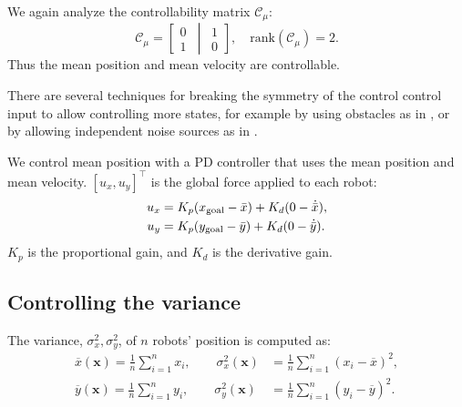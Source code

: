 We again analyze the controllability matrix $\mathcal{C}_{\mu}$:
\begin{equation}
\mathcal{C}_\mu=\left[ \begin{matrix} 
0\\
1
\end{matrix}
\,\middle\vert\,
 \begin{matrix} 
1\\
0
\end{matrix}
 \right],  \quad \textrm{rank}(\mathcal{C}_\mu)=2.
\end{equation}
Thus the mean position and mean velocity are controllable.


There are several techniques for breaking the symmetry of the control control input to allow controlling more states, for example by using obstacles as in \cite{Becker2013b}, or by allowing independent noise sources as in \cite{beckerIJRR2014}.

We control mean position with a PD controller that uses the mean position and mean velocity. $[u_x,u_y]^\top$ is the global force applied to each robot:
\begin{align}
u_x &= K_{p}(x_{\rm{goal}} - \bar{x}) + K_{d}(0-\dot{\bar{x}}), \nonumber\\
u_y &= K_{p}(y_{\rm{goal}}  - \bar{y}) + K_{d}(0-\dot{\bar{y}}).  \label{eq:PDcontrolPosition}
\end{align}
 $K_{p}$ is the proportional gain, and $K_{d}$ is the derivative gain. 


\subsection{Controlling the variance}\label{sec:VarianceControl}

The variance, $\sigma_x^2,\sigma_y^2$, of $n$ robots' position is computed as:
\begin{align}\label{eq:meanVar}
 \overline{x}(\mathbf{x}) = \frac{1}{n} \sum_{i=1}^n x_{i}, \qquad  %
\sigma_x^2(\mathbf{x}) &= \frac{1}{n} \sum_{i=1}^n (x_{i} - \overline{x})^2,  \nonumber \\ 
 \overline{y}(\mathbf{x}) = \frac{1}{n} \sum_{i=1}^n y_{i}, \qquad  %
\sigma_y^2(\mathbf{x}) &= \frac{1}{n} \sum_{i=1}^n (y_{i} - \overline{y})^2.  
\end{align}

